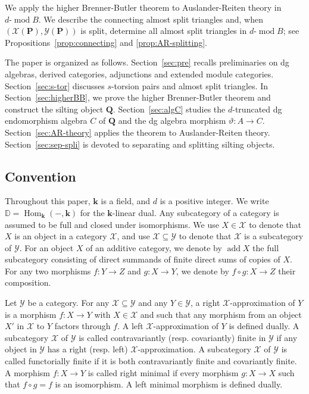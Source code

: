 \documentclass[11pt,a4paper,reqno]{amsart}
\theoremstyle{plain}
\numberwithin{equation}{section}
\theoremstyle{definition}
\providecommand{\add}{\operatorname{add}}
\renewcommand{\mod}{\operatorname{mod}}
\newcommand{\Hom}{\operatorname{Hom}}
\renewcommand{\k}{\mathbf{k}}
\newcommand{\emod}[2]{#1\text{-}\!\mod #2}
\newcommand{\PP}{\mathbf{P}}
\newcommand{\QQ}{\mathbf{Q}}
\newcommand{\X}{\mathcal{X}}
\newcommand{\Y}{\mathcal{Y}}
\begin{document}
We apply the higher Brenner-Butler theorem to Auslander-Reiten theory in $\emod{d}{B}$. We describe the connecting almost split triangles and, when $(\X(\PP),\Y(\PP))$ is split, determine all almost split triangles in $\emod{d}{B}$; see Propositions~\ref{prop:connecting} and \ref{prop:AR-splitting}.

The paper is organized as follows. Section~\ref{sec:pre} recalls preliminaries on dg algebras, derived categories, adjunctions and extended module categories. Section~\ref{sec:s-tor} discusses $s$-torsion pairs and almost split triangles. In Section~\ref{sec:higherBB}, we prove the higher Brenner-Butler theorem and construct the silting object $\QQ$. Section~\ref{sec:algC} studies the $d$-truncated dg endomorphism algebra $C$ of $\QQ$ and the dg algebra morphism $\vartheta\colon A\to C$. Section~\ref{sec:AR-theory} applies the theorem to Auslander-Reiten theory. Section~\ref{sec:sep-spli} is devoted to separating and splitting silting objects.

\subsection*{Convention}

Throughout this paper, $\k$ is a field, and $d$ is a positive integer. We write $\mathbb D=\Hom_{\k}(-,\k)$ for the $\k$-linear dual. Any subcategory of a category is assumed to be full and closed under isomorphisms. We use $X\in\X$ to denote that $X$ is an object in a category $\X$, and use $\X\subseteq\Y$ to denote that $\X$ is a subcategory of $\Y$. For an object $X$ of an additive category, we denote by $\add X$ the full subcategory consisting of direct summands of finite direct sums of copies of $X$. For any two morphisms $f\colon Y\to Z$ and $g\colon X\to Y$, we denote by $f\circ g\colon X\to Z$ their composition.

Let $\Y$ be a category. For any $\X\subseteq\Y$ and any $Y\in\Y$, a right $\X$-approximation of $Y$ is a morphism $f:X\to Y$ with $X\in\X$ and such that any morphism from an object $X'$ in $\X$ to $Y$ factors through $f$. A left $\X$-approximation of $Y$ is defined dually. A subcategory $\X$ of $\Y$ is called contravariantly (resp. covariantly) finite in $\Y$ if any object in $\Y$ has a right (resp. left) $\X$-approximation. A subcategory $\X$ of $\Y$ is called functorially finite if it is both contravariantly finite and covariantly finite. A morphism $f:X\to Y$ is called right minimal if every morphism $g:X\to X$ such that $f\circ g=f$ is an isomorphism. A left minimal morphism is defined dually.
\end{document}
